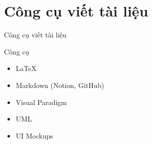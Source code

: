 \documentclass{beamer}
\begin{document}
\section{Công cụ viết tài liệu}

\begin{frame}{Công cụ viết tài liệu}
    \begin{block}{Công cụ}
        \begin{itemize}
            \item \LaTeX
            \item Markdown (Notion, GitHub)
            \item Visual Paradigm
            \item UML
            \item UI Mockups
        \end{itemize}
    \end{block}
\end{frame}
\end{document}
